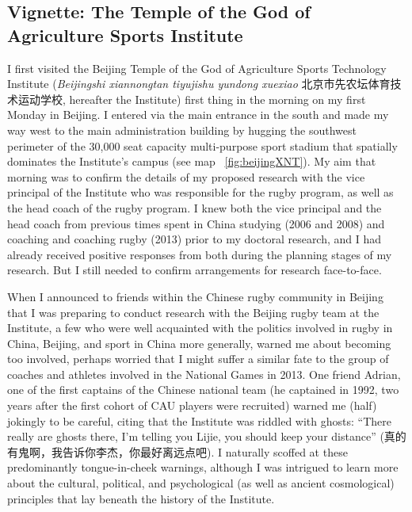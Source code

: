                                           \begin{CJK}{UTF8}{gbsn}

\section{Vignette: The Temple of the God of Agriculture Sports Institute}
I first visited the Beijing Temple of the God of Agriculture Sports Technology Institute (\textit{Beijingshi xiannongtan tiyujishu yundong xuexiao} 北京市先农坛体育技术运动学校,
hereafter the Institute) first thing in the morning on my first Monday in Beijing.  I entered via the main entrance in the south and made my way west to the main administration building by hugging the southwest perimeter of the 30,000 seat capacity multi-purpose sport stadium that spatially dominates the Institute's campus (see map ~\ref{fig:beijingXNT}). My aim that morning was to confirm the details of my proposed research with the vice principal of the Institute who was responsible for the rugby program, as well as the head coach of the rugby program.  I knew both the vice principal and the head coach from previous times spent in China studying (2006 and 2008) and coaching and coaching rugby (2013) prior to my doctoral research, and I had already received positive responses from both during the planning stages of my research.  But I still needed to confirm arrangements for research face-to-face.

When I announced to friends within the Chinese rugby community in Beijing that I was preparing to conduct research with the Beijing rugby team at the Institute, a few who were well acquainted with the politics involved in rugby in China, Beijing, and sport in China more generally, warned me about becoming too involved, perhaps worried that I might suffer a similar fate to the group of coaches and athletes involved in the National Games in 2013.  One friend Adrian, one of the first captains of the Chinese national team (he captained in 1992, two years after the first cohort of CAU players were recruited) warned me (half) jokingly to be careful, citing that the Institute was riddled with ghosts: ``There really are ghosts there, I'm telling you Lijie, you should keep your distance'' (真的有鬼啊，我告诉你李杰，你最好离远点吧).  I naturally scoffed at these predominantly tongue-in-cheek warnings, although I was intrigued to learn more about the cultural, political, and psychological (as well as ancient cosmological) principles that lay beneath the history of the Institute.


\end{CJK}
